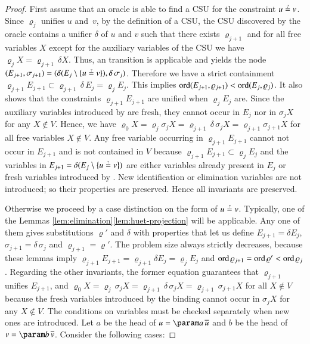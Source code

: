 \begin{proof}
    First assume that an oracle is able to find a CSU for the constraint $u\unif v$.
    Since $\varrho_{j}$ unifies $u$ and~$v$, by the definition of a CSU,
    the CSU discovered by the oracle 
    contains a
    unifier $\delta$ of $u$ and $v$ such that there exists $\varrho_{j+1}$
    and for all free variables $X$ except for the auxiliary variables of the CSU
    we have $\varrho_{j} X=\varrho_{j+1}\,\delta X$. Thus, an 
    transition is applicable and yields the node 
    $(E_{j+1},\sigma_{j+1})=(\delta(E_{j}\setminus\{ u\unif v\} ),\delta\,\sigma_{j})$.
    Therefore we have a strict containment $\varrho_{j+1}E_{j+1}\subset\varrho_{j+1}\,\delta\,E_{j}=\varrho_{j}E_{j}$.
    This implies $\operatorname{ord}(E_{j+1},\varrho_{j+1})<\operatorname{ord}(E_{j},\varrho_{j})$.
    It also shows that the constraints $\varrho_{j+1}E_{j+1}$ are unified
    when $\varrho_{j}E_{j}$ are. 
    Since the auxiliary variables introduced by  are fresh,
    they cannot occur in $E_j$ nor in $\sigma_{j} X$ for any $X\not\in V$. Hence,
    we have $\varrho_{0} X = \varrho_{j}\sigma_{j} X = \varrho_{j+1}\,\delta\,\sigma_{j} X =\varrho_{j+1}\sigma_{j+1} X$
    for all free variables $X\not\in V$.
    Any free variable occurring in $\varrho_{j+1}E_{j+1}$ cannot not occur in $E_{j+1}$ and is not contained in $V$
    because  $\varrho_{j+1}E_{j+1}\subset\varrho_{j}E_{j}$
    and the variables in $E_{j+1} = \delta(E_{j}\setminus\{ u\unif v\} )$
    are either variables already present in $E_{j}$ or fresh variables introduced by .
    New identification or elimination variables are not introduced;
    so their properties are preserved. Hence all invariants are preserved.

    Otherwise we proceed by a case distinction on the form of $u\unif v$.
    Typically, one of the Lemmas \ref{lem:elimination}\textendash{}\ref{lem:huet-projection}
    will be applicable. Any one of them gives substitutions $\varrho'$
    and $\delta$ with properties that let us define $E_{j+1}=\delta E_{j}$,
    $\sigma_{j+1}=\delta\,\sigma_{j}$ and $\varrho_{j+1}=\varrho'$.
    The problem size always strictly decreases, because 
    these lemmas imply
    $\varrho_{j+1}E_{j+1}=\varrho_{j+1}\delta E_{j}=\varrho_{j}E_{j}$
    and $\operatorname{ord}\varrho_{j+1}=\operatorname{ord}\varrho'<\operatorname{ord}\varrho_{j}$.
    Regarding the other invariants, the former equation guarantees that $\varrho_{j+1}$
    unifies $E_{j+1}$, and 
    $\varrho_{0} X = \varrho_{j}\,\sigma_{j} X = \varrho_{j+1}\,\delta\,\sigma_{j} X =\varrho_{j+1}\,\sigma_{j+1} X$
    for all $X \not\in V$ because the fresh variables introduced by the binding cannot occur in $\sigma_{j} X$ for any $X\not\in V$. The conditions on variables must be checked
    separately when new ones are introduced. Let $a$ be
    the head of $u=\param a\,\seq u$ and $b$ be the head of $v = \param b\,\seq v$.
    Consider the following cases:


\end{proof}

